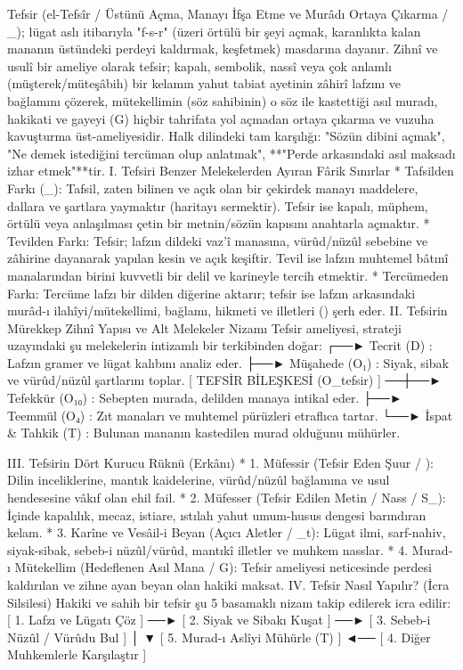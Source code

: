\documentclass[11pt,a4paper]{article}
\begin{document}
Tefsir (el-Tefsîr / Üstünü Açma, Manayı İfşa Etme ve Murâdı Ortaya Çıkarma / _{}); lügat aslı itibarıyla "f-s-r" (üzeri örtülü bir şeyi açmak, karanlıkta kalan mananın üstündeki perdeyi kaldırmak, keşfetmek) masdarına dayanır.
Zihnî ve usulî bir ameliye olarak tefsir; kapalı, sembolik, nassî veya çok anlamlı (müşterek/müteşâbih) bir kelamın yahut tabiat ayetinin zâhirî lafzını ve bağlamını çözerek, mütekellimin (söz sahibinin) o söz ile kastettiği asıl muradı, hakikati ve gayeyi (G) hiçbir tahrifata yol açmadan ortaya çıkarma ve vuzuha kavuşturma üst-ameliyesidir.
Halk dilindeki tam karşılığı: "Sözün dibini açmak", "Ne demek istediğini tercüman olup anlatmak", **"Perde arkasındaki asıl maksadı izhar etmek"**tir.
I. Tefsiri Benzer Melekelerden Ayıran Fârik Sınırlar
 * Tafsilden Farkı (_{}):
   Tafsil, zaten bilinen ve açık olan bir çekirdek manayı maddelere, dallara ve şartlara yaymaktır (haritayı sermektir). Tefsir ise kapalı, müphem, örtülü veya anlaşılması çetin bir metnin/sözün kapısını anahtarla açmaktır.
 * Tevilden Farkı:
   Tefsir; lafzın dildeki vaz'î manasına, vürûd/nüzûl sebebine ve zâhirine dayanarak yapılan kesin ve açık keşiftir. Tevil ise lafzın muhtemel bâtınî manalarından birini kuvvetli bir delil ve karineyle tercih etmektir.
 * Tercümeden Farkı:
   Tercüme lafzı bir dilden diğerine aktarır; tefsir ise lafzın arkasındaki murâd-ı ilahîyi/mütekellimi, bağlamı, hikmeti ve illetleri () şerh eder.
II. Tefsirin Mürekkep Zihnî Yapısı ve Alt Melekeler Nizamı
Tefsir ameliyesi,  strateji uzayındaki şu melekelerin intizamlı bir terkibinden doğar:
                                  ┌──► Tecrit (D)          : Lafzın gramer ve lügat kalıbını analiz eder.
                                  ├──► Müşahede (O₁)        : Siyak, sibak ve vürûd/nüzûl şartlarını toplar.
[ TEFSİR BİLEŞKESİ (O_tefsir) ] ──┼──► Tefekkür (O₁₀)      : Sebepten murada, delilden manaya intikal eder.
                                  ├──► Teemmül (O₄)        : Zıt manaları ve muhtemel pürüzleri etraflıca tartar.
                                  └──► İspat & Tahkik (T)  : Bulunan mananın kastedilen murad olduğunu mühürler.

III. Tefsirin Dört Kurucu Rüknü (Erkânı)
 * 1. Müfessir (Tefsir Eden Şuur / ): Dilin inceliklerine, mantık kaidelerine, vürûd/nüzûl bağlamına ve usul hendesesine vâkıf olan ehil fail.
 * 2. Müfesser (Tefsir Edilen Metin / Nass / S_{}): İçinde kapalılık, mecaz, istiare, ıstılah yahut umum-husus dengesi barındıran kelam.
 * 3. Karîne ve Vesâil-i Beyan (Açıcı Aletler / _t): Lügat ilmi, sarf-nahiv, siyak-sibak, sebeb-i nüzûl/vürûd, mantıkî illetler ve muhkem nasslar.
 * 4. Murad-ı Mütekellim (Hedeflenen Asıl Mana / G): Tefsir ameliyesi neticesinde perdesi kaldırılan ve zihne ayan beyan olan hakiki maksat.
IV. Tefsir Nasıl Yapılır? (İcra Silsilesi)
Hakiki ve sahih bir tefsir şu 5 basamaklı nizam takip edilerek icra edilir:
[ 1. Lafzı ve Lügatı Çöz ] ──► [ 2. Siyak ve Sibakı Kuşat ] ──► [ 3. Sebeb-i Nüzûl / Vürûdu Bul ]
                                                                             │
                                                                             ▼
[ 5. Murad-ı Aslîyi Mühürle (T) ] ◄── [ 4. Diğer Muhkemlerle Karşılaştır ]
\end{document}
